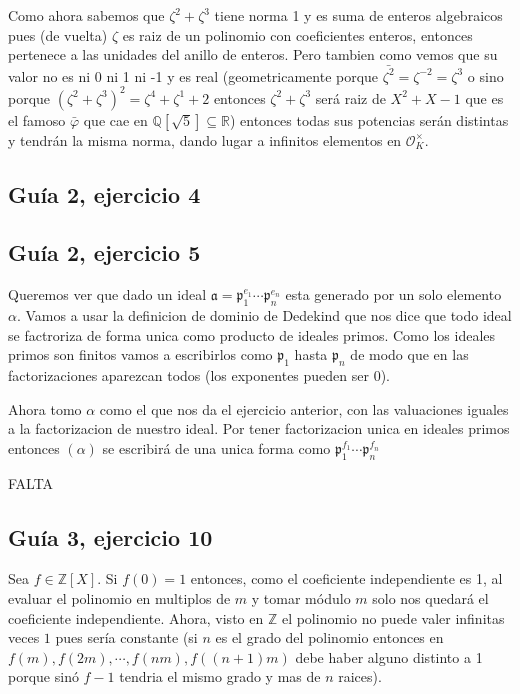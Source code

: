 \documentclass[12pt]{amsart}
\newcommand{\QQ}{\mathbb{Q}}
\newcommand{\RR}{\mathbb{R}}
\newcommand{\ZZ}{\mathbb{Z}}
\newcommand{\pp}{\mathfrak{p}}
\newcommand{\aaa}{\mathfrak{a}}
\newcommand{\OO}{\mathcal{O}}
\theoremstyle{plain}
\begin{document}
Como ahora sabemos que $\zeta^2+\zeta^3$ tiene norma 1 y es suma de 
enteros algebraicos pues (de vuelta) $\zeta$ es raiz de un polinomio con
coeficientes enteros, entonces pertenece a las unidades del anillo de 
enteros. Pero tambien como vemos que su valor no es ni 0 ni 1 ni -1 y 
es real (geometricamente porque $\bar{\zeta^2}=\zeta^{-2} = 
\zeta^3$ o sino porque 
$(\zeta^2+\zeta^3)^2=\zeta^4+\zeta^1+2$ entonces $\zeta^2+\zeta^3$ 
será raiz de $X^2+X-1$ que es el famoso $\bar{\varphi}$ que cae en 
$\QQ[\sqrt{5}]\subseteq \RR$) entonces todas sus potencias serán 
distintas y tendrán la misma norma, dando lugar a infinitos 
elementos en $\OO_K^\times$.


\subsection*{Guía 2, ejercicio 4}

\subsection*{Guía 2, ejercicio 5}

Queremos ver que dado un ideal $\aaa = \pp_1^{e_1}\cdots\pp_n^{e_n}$ 
esta generado por un solo elemento $\alpha$. Vamos a usar la 
definicion de dominio de Dedekind que nos dice que todo ideal se 
factroriza de forma unica como producto de ideales primos.
Como los ideales primos son finitos vamos a escribirlos como $\pp_1$
hasta $\pp_n$ de modo que en las factorizaciones aparezcan todos (los
exponentes pueden ser $0$).

Ahora tomo $\alpha$ como el que nos da el ejercicio anterior, con las 
valuaciones iguales a la factorizacion de nuestro ideal. Por tener 
factorizacion unica en ideales primos entonces $(\alpha)$ se escribirá
de una unica forma como $\pp_1^{f_1}\cdots\pp_n^{f_n}$

FALTA


\subsection*{Guía 3, ejercicio 10}

Sea $f\in \ZZ[X]$. Si $f(0)=1$ entonces, como el coeficiente 
independiente es 1, al evaluar el polinomio en multiplos de $m$ y 
tomar módulo $m$ solo nos quedará el coeficiente independiente. Ahora,
visto en $\ZZ$ el polinomio no puede valer infinitas veces $1$ pues 
sería constante (si $n$ es el grado del polinomio entonces en $f(m), 
f(2m), \cdots, f(nm), f((n+1)m)$ debe haber alguno distinto a 1 
porque sinó $f-1$ tendria el mismo grado y mas de $n$ raices). 
\end{document}

